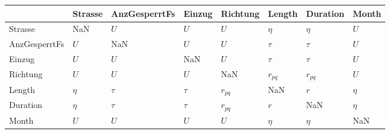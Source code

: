 \begin{tabular}{llllllll}
\toprule
{} & Strasse & AnzGesperrtFs &  Einzug &  Richtung &    Length &  Duration &   Month \\
\midrule
Strasse       &     NaN &           $U$ &     $U$ &       $U$ &    $\eta$ &    $\eta$ &     $U$ \\
AnzGesperrtFs &     $U$ &           NaN &     $U$ &       $U$ &    $\tau$ &    $\tau$ &     $U$ \\
Einzug        &     $U$ &           $U$ &     NaN &       $U$ &    $\tau$ &    $\tau$ &     $U$ \\
Richtung      &     $U$ &           $U$ &     $U$ &       NaN &  $r_{pq}$ &  $r_{pq}$ &     $U$ \\
Length        &  $\eta$ &        $\tau$ &  $\tau$ &  $r_{pq}$ &       NaN &       $r$ &  $\eta$ \\
Duration      &  $\eta$ &        $\tau$ &  $\tau$ &  $r_{pq}$ &       $r$ &       NaN &  $\eta$ \\
Month         &     $U$ &           $U$ &     $U$ &       $U$ &    $\eta$ &    $\eta$ &     NaN \\
\bottomrule
\end{tabular}
